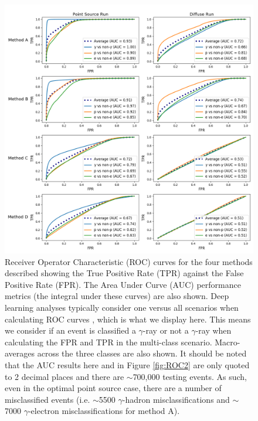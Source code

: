 \begin{figure}
  \centering
  \includegraphics[width=\textwidth]{figures/final_newlabels.png}
  \caption{Receiver Operator Characteristic (ROC) curves for the four methods described showing the True Positive Rate (TPR) against the False Positive Rate (FPR). The Area Under Curve (AUC) performance metrics (the integral under these curves) are also shown. Deep learning analyses typically consider one versus all scenarios when calculating ROC curves \cite{scikit}, which is what we display here.  This means we consider if an event is classified a $\gamma$-ray or not a $\gamma$-ray when calculating the FPR and TPR in the multi-class scenario. Macro-averages across the three classes are also shown. It should be noted that the AUC results here and in Figure \ref{fig:ROC2} are only quoted to 2 decimal places and there are $\sim$700,000 testing events. As such, even in the optimal point source case, there are a number of misclassified events (i.e. $\sim$5500 $\gamma$-hadron misclassifications and $\sim$7000 $\gamma$-electron misclassifications for method A).
  }
  \label{fig:ROC}
\end{figure}
